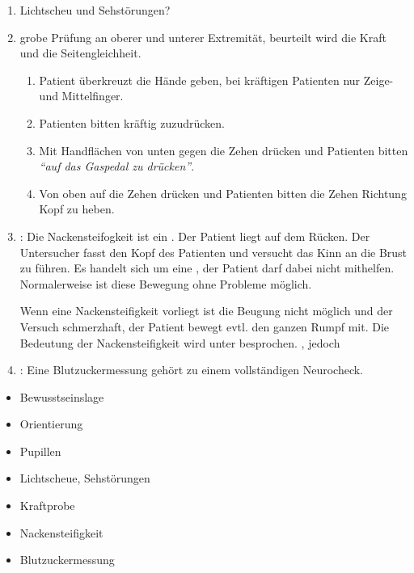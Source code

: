 {\begin{enumerate}
\begin{enumerate}
    Beurteilung von:
    \begin{enumerate}
      \item Schnelligkeit der Reaktion: prompt, verzögert?
      \item Reagieren immer beide
      Pupillen?~
    \end{enumerate}
  \end{enumerate}
  \item Lichtscheu und Sehstörungen?
  \item {} grobe Prüfung an oberer und
  unterer Extremität, beurteilt wird die Kraft und die
  Seitengleichheit.
  \begin{enumerate}
    \item Patient überkreuzt die Hände geben, bei kräftigen
    Patienten nur Zeige- und Mittelfinger.
    \item Patienten bitten kräftig zuzudrücken.
    \item Mit Handflächen von unten gegen die Zehen drücken
    und Patienten bitten \emph{\enquote{auf das Gaspedal zu
    drücken}}.
    \item Von oben auf die Zehen drücken und Patienten bitten
    die Zehen Richtung Kopf zu heben.
  \end{enumerate}
  \item
  \label{topic:nackensteifigkeit-untersuchung}:
  Die Nackensteifogkeit ist ein
  .
  Der Patient liegt  auf dem Rücken. Der
  Untersucher fasst den Kopf des Patienten und versucht das
  Kinn an die Brust zu führen. Es handelt sich um eine
  , der Patient darf dabei nicht
  mithelfen.
  Normalerweise ist diese Bewegung ohne Probleme möglich.
  
  Wenn eine Nackensteifigkeit vorliegt ist die Beugung nicht
  möglich und der Versuch schmerzhaft, der Patient bewegt
  evtl. den ganzen Rumpf mit. Die Bedeutung der
  Nackensteifigkeit wird unter 
  besprochen. , jedoch
  \item
  : Eine Blutzuckermessung gehört zu
  einem vollständigen Neurocheck.
\end{enumerate}
}{
\begin{itemize}
  \item Bewusstseinslage
  \item Orientierung
  \item Pupillen
  \item Lichtscheue, Sehstörungen
  \item Kraftprobe
  \item Nackensteifigkeit
  \item[+] Blutzuckermessung
\end{itemize}
}{}{}{}

